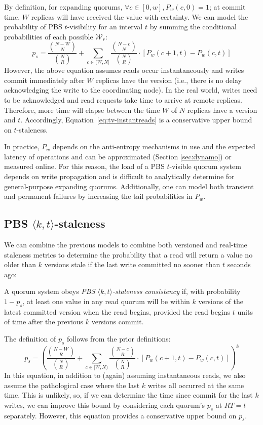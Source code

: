 \documentclass{vldb}
\newcommand{\subsectionskip}{-0em}
\begin{document}
By definition, for expanding quorums, $\forall c \in [0, w], P_w(c,0)
= 1$; at commit time, $W$ replicas will have received the value with
certainty.  We can model the probability of PBS $t$-visibility for an
interval $t$ by summing the conditional probabilities of each possible
$\mathcal{W}_r$:
\begin{equation}
\label{eq:tv-instantreads}
p_{s} = \frac{{N-W \choose N}}{{N \choose R}}+\sum_{c\in(W, N]} \frac{{N-c \choose N}}{{N \choose R}}\cdot [P_w(c+1, t)-P_w(c,t)]
\end{equation}
However, the above equation assumes reads occur instantaneously and
writes commit immediately after $W$ replicas have the version (i.e.,
there is no delay acknowledging the write to the coordinating node).
In the real world, writes need to be acknowledged and read requests
take time to arrive at remote replicas.  Therefore, more time will elapse
between the time $W$ of $N$ replicas have a version and $t$.
Accordingly, Equation~\ref{eq:tv-instantreads} is a conservative upper
bound on $t$-staleness.

In practice, $P_w$ depends on the anti-entropy mechanisms in use and the
expected latency of operations and can be approximated (Section
\ref{sec:dynamo}) or measured online.  For this reason, the load of a
PBS $t$-visible quorum system depends on write propagation and is
difficult to analytically determine for general-purpose expanding
quorums.  Additionally, one can model both transient and permanent
failures by increasing the tail probabilities in $P_w$.


\vspace{\subsectionskip}\subsection{PBS $\langle k, t \rangle$-staleness}

We can combine the previous models to combine both versioned and
real-time staleness metrics to determine the probability that a read
will return a value no older than $k$ versions stale if the last write
committed no sooner than $t$ seconds ago:
\begin{definition}
A quorum system obeys \textit{PBS $\langle k, t \rangle$-staleness
  consistency} if, with probability $1-p_{s}$, at least one value in
any read quorum will be within $k$ versions of the latest committed
version when the read begins, provided the read begins $t$ units of
time after the previous $k$ versions commit.
\end{definition}
The definition of $p_{s}$ follows from the prior definitions:
\begin{equation}
p_{s} = \left(\frac{{N-W \choose R}}{{N \choose R}}+\sum_{c\in[W, N)} \frac{{N-c \choose R}}{{N \choose R}} \cdot [P_w(c+1, t)-P_w(c,t)]\right)^k
\end{equation}
In this equation, in addition to (again) assuming instantaneous reads,
we also assume the pathological case where the last $k$ writes all
occurred at the same time.  This is unlikely, so, if we can determine
the time since commit for the last $k$ writes, we can improve this
bound by considering each quorum's $p_{s}$ at $RT=t$ separately.
However, this equation provides a conservative upper bound on $p_{s}$.
\end{document}
